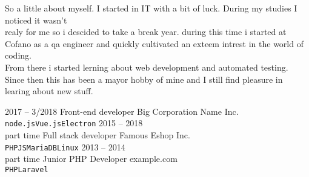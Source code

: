 \documentclass[9pt]{developercv} %
\begin{document}
    \begin{minipage}[t]{0.4\textwidth} %
        \vspace{-\baselineskip} %

        {
            So a little about myself. I started in IT with a bit of luck. During my studies I noticed it wasn't \\
            realy for me so i descided to take a break year.
            during this time i started at Cofano as a qa engineer and quickly cultivated an exteem intrest in the world of coding. \\
            From there i started lerning about web development and automated testing.
            Since then this has been a mayor hobby of mine and I still find pleasure in learing about new stuff.

        }

    \end{minipage}
    \hfill %
    \begin{minipage}[t]{0.5\textwidth} %
        \vspace{-\baselineskip} %
        \begin{barchart}{5.5}
        \end{barchart}
    \end{minipage}



    \begin{entrylist}
        \entry
        {2017 -- 3/2018}
        {Front-end developer}
        {Big Corporation Name Inc.}
        {\lorem \lorem \lorem\\ \texttt{node.js}\slashsep\texttt{Vue.js}\slashsep\texttt{Electron}}
        \entry
        {2015 -- 2018\\\footnotesize{part time}}
        {Full stack developer}
        {Famous Eshop Inc.}
        {\lorem\lorem\\ \texttt{PHP}\slashsep\texttt{JS}\slashsep\texttt{MariaDB}\slashsep\texttt{Linux}}
        \entry
        {2013 -- 2014\\\footnotesize{part time}}
        {Junior PHP Developer}
        {example.com}
        {\lorem\lorem\\ \texttt{PHP}\slashsep\texttt{Laravel}}
    \end{entrylist}
\end{document}
